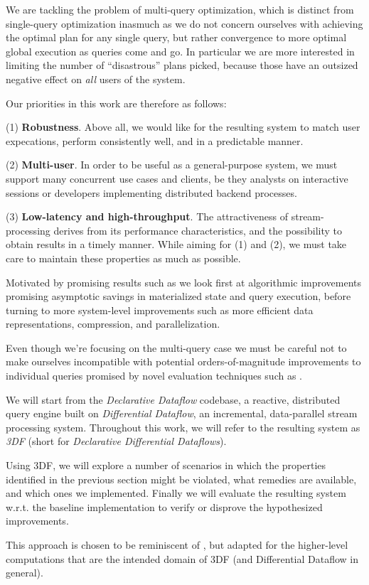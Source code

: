 \documentclass[../index.tex]{subfiles}
\begin{document}
We are tackling the problem of multi-query optimization, which is
distinct from single-query optimization inasmuch as we do not concern
ourselves with achieving the optimal plan for any single query, but
rather convergence to more optimal global execution as queries come
and go. In particular we are more interested in limiting the number of
``disastrous'' plans picked, because those have an outsized negative
effect on \emph{all} users of the system.

Our priorities in this work are therefore as follows:

(1) \textbf{Robustness}. Above all, we would like for the resulting system
to match user expecations, perform consistently well, and in a
predictable manner.

(2) \textbf{Multi-user}. In order to be useful as a general-purpose system,
we must support many concurrent use cases and clients, be they
analysts on interactive sessions or developers implementing
distributed backend processes.

(3) \textbf{Low-latency and high-throughput}. The attractiveness of
stream-processing derives from its performance characteristics, and
the possibility to obtain results in a timely manner. While aiming for
(1) and (2), we must take care to maintain these properties as much as
possible.

Motivated by promising results such as \cite{aref2015design} we look
first at algorithmic improvements promising asymptotic savings in
materialized state and query execution, before turning to more
system-level improvements such as more efficient data representations,
compression, and parallelization.

Even though we're focusing on the multi-query case we must be careful
not to make ourselves incompatible with potential orders-of-magnitude
improvements to individual queries promised by novel evaluation
techniques such as \cite{tekle2011more}.

We will start from the \emph{Declarative Dataflow} codebase, a
reactive, distributed query engine built on \emph{Differential
  Dataflow}, an incremental, data-parallel stream processing
system. Throughout this work, we will refer to the resulting system as
\emph{3DF} (short for \emph{Declarative Differential Dataflows}).

Using 3DF, we will explore a number of scenarios in which the
properties identified in the previous section might be violated, what
remedies are available, and which ones we implemented. Finally we will
evaluate the resulting system w.r.t. the baseline implementation to
verify or disprove the hypothesized improvements.

This approach is chosen to be reminiscent of \cite{hirzel2014catalog},
but adapted for the higher-level computations that are the intended
domain of 3DF (and Differential Dataflow in general).
\end{document}
